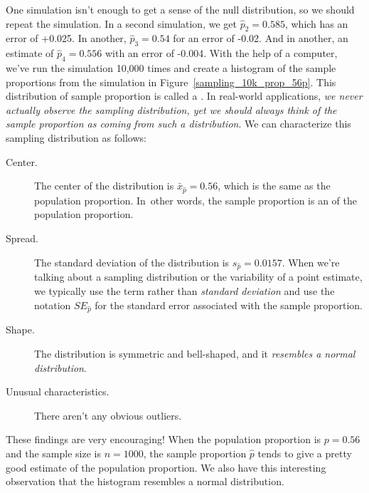 One simulation isn't enough to get a sense of the null
distribution, so we should repeat the simulation. In a second
simulation, we get $\hat{p}_2 = 0.585$, which has an error of
+0.025.
In another, $\hat{p}_3 = 0.54$ for an error of -0.02. And in another,
an estimate of $\hat{p}_4 = 0.556$ with an error of -0.004.
With the help of a computer, we've run the simulation 10,000 times
and create a histogram of the sample proportions from the simulation
in Figure~\ref{sampling_10k_prop_56p}. This
distribution of sample proportion is called a
. In real-world applications,
\emph{we never actually observe the sampling distribution, yet we
should always think of the sample proportion as coming from
such a distribution}.
We can characterize this sampling distribution as follows:
\begin{description}
\item[Center.] The center of the distribution is
    $\bar{x}_{\hat{p}} = 0.56$, which is the same as the
    population proportion.
    In~other words, the sample proportion is an
     of the population proportion.
\item[Spread.] The standard deviation of the distribution
    is $s_{\hat{p}} = 0.0157$. When we're talking about
    a sampling distribution or the variability of
    a point estimate, we typically use the term
     rather than \emph{standard deviation}
    and use the notation $SE_{\hat{p}}$ for the standard
    error associated with the sample proportion.
\item[Shape.] The distribution is symmetric and bell-shaped,
    and it \emph{resembles a normal distribution}.
\item[Unusual characteristics.] There aren't any obvious outliers.
\end{description}
These findings are very encouraging! When the population
proportion is $p = 0.56$ and the sample size is $n = 1000$,
the sample proportion $\hat{p}$ tends to give a pretty good estimate
of the population proportion. We also have this interesting observation
that the histogram resembles a normal distribution.

